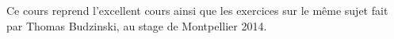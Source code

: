 Ce cours reprend l'excellent cours ainsi que les exercices sur le même sujet fait par Thomas Budzinski, au stage de Montpellier 2014.